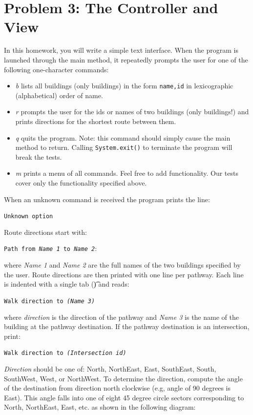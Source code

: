 \documentclass[11pt]{article}
\begin{document}
\section*{Problem 3: The Controller and View}
\label{sec:Problem 3}

\noindent In this homework, you will write a simple text interface. When the program is launched through the main method, it repeatedly prompts the user for one of the following one-character commands:

\begin{itemize}
\item \textit{b} lists all buildings (only buildings) in the form \texttt{name,id} in lexicographic (alphabetical) order of name.
\item \textit{r} prompts the user for the ids or names of two buildings (only buildings!) and prints directions for the shortest route between them.
\item \textit{q} quits the program. Note: this command should simply cause the main method to return. Calling \texttt{System.exit()} to terminate the program will break the tests.
\item \textit{m} prints a menu of all commands. Feel free to add functionality. Our tests cover only the functionality specified above.
\end{itemize}

\noindent When an unknown command is received the program prints the line:

\noindent \texttt{Unknown option}

\noindent Route directions start with:

\noindent \texttt{Path from \textit{Name 1} to \textit{Name 2}}:

\noindent where \textit{Name 1} and \textit{Name 2} are the full names of the two buildings specified by the user. Route directions are then printed with one line per pathway. Each line is indented with a single tab (\t) and reads:

\texttt{Walk direction to \textit{(Name 3)}}

\noindent where \textit{direction} is the direction of the pathway and \textit{Name 3} is the name of the building at the pathway destination. If the pathway destination is an intersection, print:

   \texttt{Walk direction to \textit{(Intersection id)}}

\noindent \textit{Direction} should be one of: North, NorthEast, East, SouthEast, South, SouthWest, West, or NorthWest. To determine the direction, compute the angle of the destination from direction north clockwise (e.g, angle of 90 degrees is East). This angle falls into one of eight 45 degree circle sectors corresponding to North, NorthEast, East, etc. as shown in the following diagram:
\end{document}
